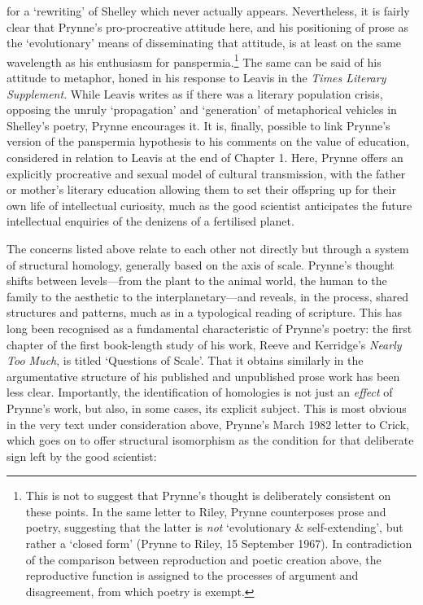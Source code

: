 \documentclass[]{article}
\begin{document}
for a `rewriting' of Shelley which never actually appears. Nevertheless,
it is fairly clear that Prynne's pro-procreative attitude here, and his
positioning of prose as the `evolutionary' means of disseminating that
attitude, is at least on the same wavelength as his enthusiasm for
panspermia.\footnote{This is not to suggest that Prynne's thought is
  deliberately consistent on these points. In the same letter to Riley,
  Prynne counterposes prose and poetry, suggesting that the latter is
  \emph{not} `evolutionary \& self-extending', but rather a `closed
  form' (Prynne to Riley, 15 September 1967). In contradiction of the
  comparison between reproduction and poetic creation above, the
  reproductive function is assigned to the processes of argument and
  disagreement, from which poetry is exempt.} The same can be said of
his attitude to metaphor, honed in his response to Leavis in the
\emph{Times Literary Supplement}. While Leavis writes as if there was a
literary population crisis, opposing the unruly `propagation' and
`generation' of metaphorical vehicles in Shelley's poetry, Prynne
encourages it. It is, finally, possible to link Prynne's version of the
panspermia hypothesis to his comments on the value of education,
considered in relation to Leavis at the end of Chapter 1. Here, Prynne
offers an explicitly procreative and sexual model of cultural
transmission, with the father or mother's literary education allowing
them to set their offspring up for their own life of intellectual
curiosity, much as the good scientist anticipates the future
intellectual enquiries of the denizens of a fertilised planet.

The concerns listed above relate to each other not directly but through
a system of structural homology, generally based on the axis of scale.
Prynne's thought shifts between levels---from the plant to the animal
world, the human to the family to the aesthetic to the
interplanetary---and reveals, in the process, shared structures and
patterns, much as in a typological reading of scripture. This has long
been recognised as a fundamental characteristic of Prynne's poetry: the
first chapter of the first book-length study of his work, Reeve and
Kerridge's \emph{Nearly Too Much}, is titled `Questions of Scale'. That
it obtains similarly in the argumentative structure of his published and
unpublished prose work has been less clear. Importantly, the
identification of homologies is not just an \emph{effect} of Prynne's
work, but also, in some cases, its explicit subject. This is most
obvious in the very text under consideration above, Prynne's March 1982
letter to Crick, which goes on to offer structural isomorphism as the
condition for that deliberate sign left by the good scientist:
\end{document}
